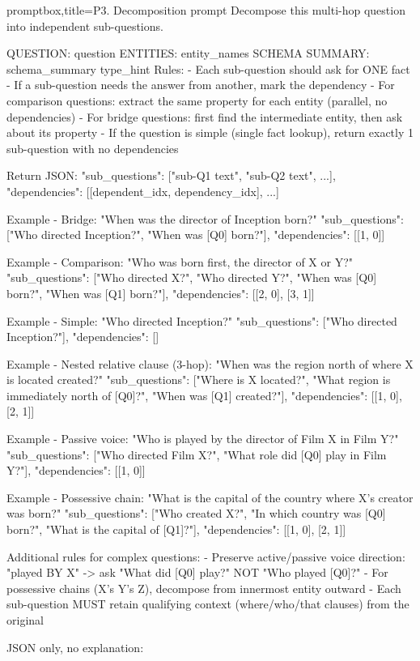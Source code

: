 \documentclass[11pt]{article}
\begin{document}
\begin{tcblisting}{promptbox,title={P3. Decomposition prompt}}
Decompose this multi-hop question into independent sub-questions.

QUESTION: {question}
ENTITIES: {entity_names}
SCHEMA SUMMARY: {schema_summary}
{type_hint}
Rules:
- Each sub-question should ask for ONE fact
- If a sub-question needs the answer from another, mark the dependency
- For comparison questions: extract the same property for each entity (parallel, no dependencies)
- For bridge questions: first find the intermediate entity, then ask about its property
- If the question is simple (single fact lookup), return exactly 1 sub-question with no dependencies

Return JSON:
{
  "sub_questions": ["sub-Q1 text", "sub-Q2 text", ...],
  "dependencies": [[dependent_idx, dependency_idx], ...]
}

Example - Bridge: "When was the director of Inception born?"
{
  "sub_questions": ["Who directed Inception?", "When was [Q0] born?"],
  "dependencies": [[1, 0]]
}

Example - Comparison: "Who was born first, the director of X or Y?"
{
  "sub_questions": ["Who directed X?", "Who directed Y?",
    "When was [Q0] born?", "When was [Q1] born?"],
  "dependencies": [[2, 0], [3, 1]]
}

Example - Simple: "Who directed Inception?"
{
  "sub_questions": ["Who directed Inception?"],
  "dependencies": []
}

Example - Nested relative clause (3-hop): "When was the region north of where X is located created?"
{
  "sub_questions": ["Where is X located?", "What region is immediately north of [Q0]?", "When was [Q1] created?"],
  "dependencies": [[1, 0], [2, 1]]
}

Example - Passive voice: "Who is played by the director of Film X in Film Y?"
{
  "sub_questions": ["Who directed Film X?", "What role did [Q0] play in Film Y?"],
  "dependencies": [[1, 0]]
}

Example - Possessive chain: "What is the capital of the country where X's creator was born?"
{
  "sub_questions": ["Who created X?", "In which country was [Q0] born?", "What is the capital of [Q1]?"],
  "dependencies": [[1, 0], [2, 1]]
}

Additional rules for complex questions:
- Preserve active/passive voice direction: "played BY X" -> ask "What did [Q0] play?" NOT "Who played [Q0]?"
- For possessive chains (X's Y's Z), decompose from innermost entity outward
- Each sub-question MUST retain qualifying context (where/who/that clauses) from the original

JSON only, no explanation:
\end{tcblisting}
\end{document}
